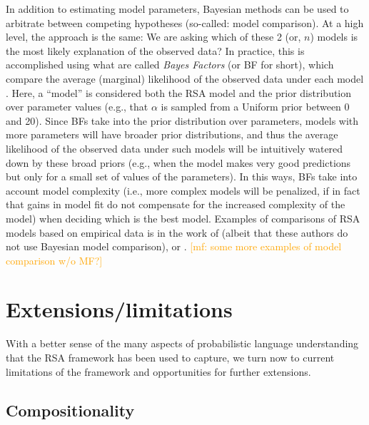 \documentclass{sp}
\newcommand{\mf}[1]{\textcolor{orange}{[mf: #1]}}
\newcommand{\mht}[1]{\textcolor{purple}{[mht: #1]}}
\begin{document}
In addition to estimating model parameters, Bayesian methods can be used to arbitrate between competing hypotheses (so-called: model comparison). At a high level, the approach is the same: We are asking which of these 2 (or, $n$) models is the most likely explanation of the observed data? In practice, this is accomplished using what are called \emph{Bayes Factors} (or BF for short), which compare the average (marginal) likelihood of the observed data under each model \citep{Jeffreys1961:Theory-of-Proba,KassRaftery1995:Bayes-Factors}. Here, a ``model'' is considered both the RSA model and the prior distribution over parameter values (e.g., that $\alpha$ is sampled from a Uniform prior between 0 and 20). Since BFs take into the prior distribution over parameters, models with more parameters will have broader prior distributions, and thus the average likelihood of the observed data under such models will be intuitively watered down by these broad priors (e.g., when the model makes very good predictions but only for a small set of values of the parameters). In this ways, BFs take into account model complexity (i.e., more complex models will be penalized, if in fact that gains in model fit do not compensate for the increased complexity of the model) when deciding which is the best model.
Examples of comparisons of RSA models based on empirical data is in the work of \citet{PottsLassiter2016:Embedded-implic} (albeit that these authors do not use Bayesian model comparison), \citet{qingfranke2015} or \citet{FrankeBergen2020:Theory-driven-s}.
\mf{some more examples of model comparison w/o MF?}



\section{Extensions/limitations} \label{limitations}

With a better sense of the many aspects of probabilistic language understanding that the RSA framework has been used to capture, we turn now to current limitations of the framework and opportunities for further extensions.

\subsection{Compositionality}
\end{document}
